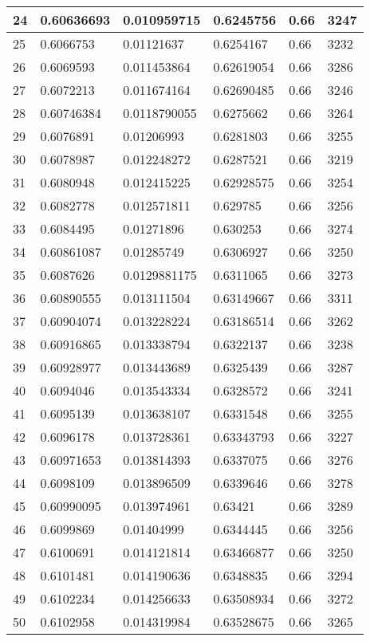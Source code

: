 \begin{longtable}{|l|l|l|l|l|l|}
24 & 0.60636693 & 0.010959715 & 0.6245756 & 0.66 & 3247 \\ \hline 
25 & 0.6066753 & 0.01121637 & 0.6254167 & 0.66 & 3232 \\ \hline 
26 & 0.6069593 & 0.011453864 & 0.62619054 & 0.66 & 3286 \\ \hline 
27 & 0.6072213 & 0.011674164 & 0.62690485 & 0.66 & 3246 \\ \hline 
28 & 0.60746384 & 0.0118790055 & 0.6275662 & 0.66 & 3264 \\ \hline 
29 & 0.6076891 & 0.01206993 & 0.6281803 & 0.66 & 3255 \\ \hline 
30 & 0.6078987 & 0.012248272 & 0.6287521 & 0.66 & 3219 \\ \hline 
31 & 0.6080948 & 0.012415225 & 0.62928575 & 0.66 & 3254 \\ \hline 
32 & 0.6082778 & 0.012571811 & 0.629785 & 0.66 & 3256 \\ \hline 
33 & 0.6084495 & 0.01271896 & 0.630253 & 0.66 & 3274 \\ \hline 
34 & 0.60861087 & 0.01285749 & 0.6306927 & 0.66 & 3250 \\ \hline 
35 & 0.6087626 & 0.0129881175 & 0.6311065 & 0.66 & 3273 \\ \hline 
36 & 0.60890555 & 0.013111504 & 0.63149667 & 0.66 & 3311 \\ \hline 
37 & 0.60904074 & 0.013228224 & 0.63186514 & 0.66 & 3262 \\ \hline 
38 & 0.60916865 & 0.013338794 & 0.6322137 & 0.66 & 3238 \\ \hline 
39 & 0.60928977 & 0.013443689 & 0.6325439 & 0.66 & 3287 \\ \hline 
40 & 0.6094046 & 0.013543334 & 0.6328572 & 0.66 & 3241 \\ \hline 
41 & 0.6095139 & 0.013638107 & 0.6331548 & 0.66 & 3255 \\ \hline 
42 & 0.6096178 & 0.013728361 & 0.63343793 & 0.66 & 3227 \\ \hline 
43 & 0.60971653 & 0.013814393 & 0.6337075 & 0.66 & 3276 \\ \hline 
44 & 0.6098109 & 0.013896509 & 0.6339646 & 0.66 & 3278 \\ \hline 
45 & 0.60990095 & 0.013974961 & 0.63421 & 0.66 & 3289 \\ \hline 
46 & 0.6099869 & 0.01404999 & 0.6344445 & 0.66 & 3256 \\ \hline 
47 & 0.6100691 & 0.014121814 & 0.63466877 & 0.66 & 3250 \\ \hline 
48 & 0.6101481 & 0.014190636 & 0.6348835 & 0.66 & 3294 \\ \hline 
49 & 0.6102234 & 0.014256633 & 0.63508934 & 0.66 & 3272 \\ \hline 
50 & 0.6102958 & 0.014319984 & 0.63528675 & 0.66 & 3265 \\ \hline 
\end{longtable}